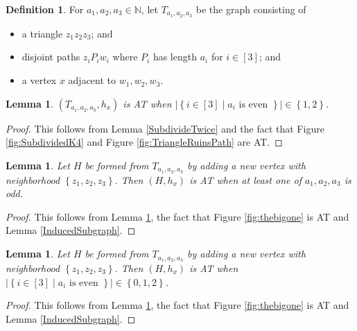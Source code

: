 \documentclass[12pt]{article}
\theoremstyle{plain}
\newtheorem{lem}[thm]{Lemma}
\theoremstyle{definition}
\newtheorem{defn}{Definition}
\theoremstyle{remark}
\newcommand{\IN}{\mathbb{N}}
\newcommand{\set}[1]{\left\{ #1 \right\}}
\newcommand{\setb}[3]{\left\{ #1 \in #2 \mid #3 \right\}}
\newcommand{\card}[1]{\left|#1\right|}
\newcommand{\irange}[1]{\left[#1\right]}
\begin{document}
\begin{defn}
	For $a_1, a_2, a_3 \in \IN$, let $T_{a_1, a_2, a_3}$ be the graph consisting of
	\begin{itemize}
		\item a triangle $z_1z_2z_3$; and
		\item disjoint paths $z_iP_iw_i$ where $P_i$ has length $a_i$ for $i \in \irange{3}$; and
		\item a vertex $x$ adjacent to $w_1, w_2, w_3$.
	\end{itemize}
\end{defn}

\begin{lem}\label{OneOrTwoEvenFromK3PathsIsAT}
	$(T_{a_1, a_2, a_3}, h_x)$ is AT when $\card{\setb{i}{\irange{3}}{a_i \text{ is even }}} \in \set{1,2}$.
\end{lem}
\begin{proof}
	This follows from Lemma \ref{SubdivideTwice} and the fact that Figure \ref{fig:SubdividedK4} and Figure \ref{fig:TriangleRuinsPath} are AT.
\end{proof}

\begin{lem}\label{OneOrTwoEvenFromK4PathsIsAT}
	Let $H$ be formed from $T_{a_1, a_2, a_3}$ by adding a new vertex with neighborhood $\set{z_1, z_2, z_3}$.  Then
	$(H, h_x)$ is AT when at least one of $a_1, a_2, a_3$ is odd.
\end{lem}
\begin{proof}
	This follows from Lemma \ref{OneOrTwoEvenFromK3PathsIsAT}, the fact that Figure \ref{fig:thebigone} is AT and Lemma \ref{InducedSubgraph}.
\end{proof}

\begin{lem}\label{OneOrTwoEvenFromK4PathsIsAT}
	Let $H$ be formed from $T_{a_1, a_2, a_3}$ by adding a new vertex with neighborhood $\set{z_1, z_2, z_3}$.  Then
	$(H, h_x)$ is AT when $\card{\setb{i}{\irange{3}}{a_i \text{ is even }}} \in \set{0,1,2}$.
\end{lem}
\begin{proof}
	This follows from Lemma \ref{OneOrTwoEvenFromK3PathsIsAT}, the fact that Figure \ref{fig:thebigone} is AT and Lemma \ref{InducedSubgraph}.
\end{proof}
\end{document}
